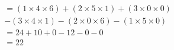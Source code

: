 \documentclass[preview]{standalone}
\begin{document}
\begin{align*}
&= (1×4×6) + (2×5×1) + (3× 0 × 0 ) \\  &- (3×4×1) - (2× 0 ×6) - (1×5× 0 ) \\  &=  24  +  10  +  0  -  12  -  0  -  0  \\  &= \boxed{ 22 }
\end{align*}
\end{document}

